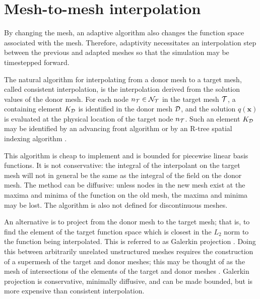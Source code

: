 \chapter{Mesh-to-mesh interpolation}
By changing the mesh, an adaptive algorithm also changes
the function space associated with the mesh. Therefore, adaptivity
necessitates an interpolation step between the previous and adapted
meshes so that the simulation may be timestepped forward.

The natural algorithm for interpolating from a donor mesh to a target
mesh, called consistent interpolation, is the interpolation derived
from the solution values of the donor mesh. For each node $n_{\cal{T}}
\in \cal{N}_{\cal{T}}$ in the target mesh $\cal{T}$, a containing
element $K_{\cal{D}}$ is identified in the donor mesh $\cal{D}$, and
the solution $q(\pmb{x})$ is evaluated at the physical location of the
target node $n_{\cal{T}}$. Such an element $K_{\cal{D}}$ may be
identified by an advancing front algorithm \citep{lohner1995} or by an
R-tree spatial indexing algorithm \citep{guttman1984}.

This algorithm is cheap to implement and is bounded for piecewise
linear basis functions. It is not conservative: the integral of the
interpolant on the target mesh will not in general be the same as the
integral of the field on the donor mesh. The method can be diffusive:
unless nodes in the new mesh exist at the maxima and minima of the
function on the old mesh, the maxima and minima may be lost. The
algorithm is also not defined for discontinuous meshes.

An alternative is to project from the donor mesh to the target mesh;
that is, to find the element of the target function space which is
closest in the $L_2$ norm to the function being interpolated. This is
referred to as Galerkin projection \citep{george1998}. Doing this
between arbitrarily unrelated unstructured meshes requires the
construction of a supermesh of the target and donor meshes; this may
be thought of as the mesh of intersections of the elements of the
target and donor meshes
\citep{farrell2009a,farrell2011conservative}. Galerkin projection is
conservative, minimally diffusive, and can be made bounded, but is
more expensive than consistent interpolation.
